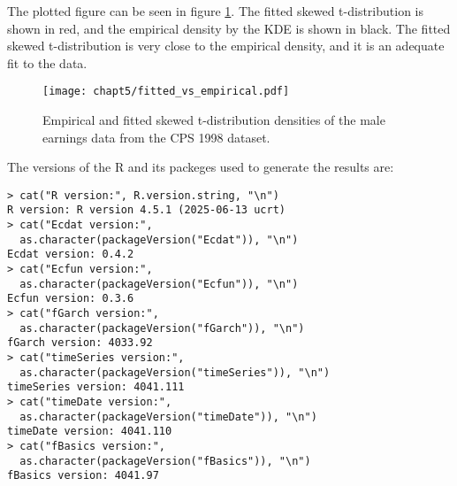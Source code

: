 \documentclass{article}
\begin{document}
The plotted figure can be seen in figure \ref{fig:fitted_vs_empirical}.
The fitted skewed t-distribution is shown in red, and the empirical density by the KDE is shown in black.
The fitted skewed t-distribution is very close to the empirical density,
and it is an adequate fit to the data.

\begin{figure}[ht]
    \centering
    \texttt{[image: chapt5/fitted\_vs\_empirical.pdf]}
    \caption{Empirical and fitted skewed t-distribution densities of
        the male earnings data from the CPS 1998 dataset.}
    \label{fig:fitted_vs_empirical}
\end{figure}

The versions of the R and its packeges used to generate the results are:
\begin{verbatim}
> cat("R version:", R.version.string, "\n")
R version: R version 4.5.1 (2025-06-13 ucrt) 
> cat("Ecdat version:",
  as.character(packageVersion("Ecdat")), "\n")
Ecdat version: 0.4.2 
> cat("Ecfun version:",
  as.character(packageVersion("Ecfun")), "\n")
Ecfun version: 0.3.6 
> cat("fGarch version:",
  as.character(packageVersion("fGarch")), "\n")
fGarch version: 4033.92 
> cat("timeSeries version:",
  as.character(packageVersion("timeSeries")), "\n")
timeSeries version: 4041.111 
> cat("timeDate version:",
  as.character(packageVersion("timeDate")), "\n")
timeDate version: 4041.110 
> cat("fBasics version:",
  as.character(packageVersion("fBasics")), "\n")
fBasics version: 4041.97
\end{verbatim}
\end{document}
